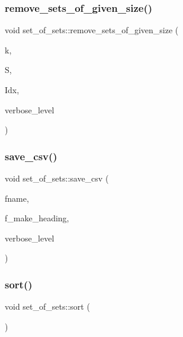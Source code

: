 \subsubsection{\texorpdfstring{remove\+\_\+sets\+\_\+of\+\_\+given\+\_\+size()}{remove\_sets\_of\_given\_size()}}
{\footnotesize\ttfamily void set\+\_\+of\+\_\+sets\+::remove\+\_\+sets\+\_\+of\+\_\+given\+\_\+size (\begin{DoxyParamCaption}\item[{\mbox{\hyperlink{galois_8h_a09fddde158a3a20bd2dcadb609de11dc}{I\+NT}}}]{k,  }\item[{\mbox{\hyperlink{classset__of__sets}{set\+\_\+of\+\_\+sets}} \&}]{S,  }\item[{\mbox{\hyperlink{galois_8h_a09fddde158a3a20bd2dcadb609de11dc}{I\+NT}} $\ast$\&}]{Idx,  }\item[{\mbox{\hyperlink{galois_8h_a09fddde158a3a20bd2dcadb609de11dc}{I\+NT}}}]{verbose\+\_\+level }\end{DoxyParamCaption})}

\mbox{\label{classset__of__sets_aa934b6fc955ed6b23419168bd0a71ec9}} 
\subsubsection{\texorpdfstring{save\+\_\+csv()}{save\_csv()}}
{\footnotesize\ttfamily void set\+\_\+of\+\_\+sets\+::save\+\_\+csv (\begin{DoxyParamCaption}\item[{const \mbox{\hyperlink{galois_8h_ab6cc7b4aeb6ea31aba2b3fbfc83ff5e6}{B\+Y\+TE}} $\ast$}]{fname,  }\item[{\mbox{\hyperlink{galois_8h_a09fddde158a3a20bd2dcadb609de11dc}{I\+NT}}}]{f\+\_\+make\+\_\+heading,  }\item[{\mbox{\hyperlink{galois_8h_a09fddde158a3a20bd2dcadb609de11dc}{I\+NT}}}]{verbose\+\_\+level }\end{DoxyParamCaption})}

\mbox{\label{classset__of__sets_a9636a136d5ac921d380cb27cf9cf277b}} 
\subsubsection{\texorpdfstring{sort()}{sort()}}
{\footnotesize\ttfamily void set\+\_\+of\+\_\+sets\+::sort (\begin{DoxyParamCaption}{ }\end{DoxyParamCaption})}

